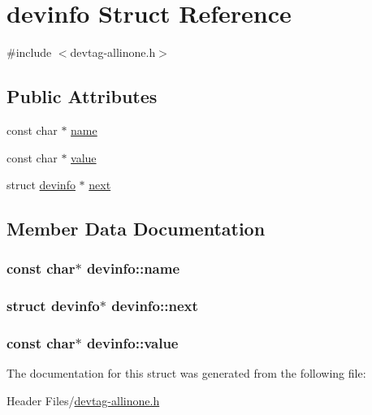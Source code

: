 \hypertarget{structdevinfo}{\section{devinfo \-Struct \-Reference}
\label{structdevinfo}
}


{\ttfamily \#include $<$devtag-\/allinone.\-h$>$}

\subsection*{\-Public \-Attributes}
\begin{DoxyCompactItemize}
\item 
const char $\ast$ \hyperlink{structdevinfo_a6a75887c01a3f6b18b552c1d42d54230}{name}
\item 
const char $\ast$ \hyperlink{structdevinfo_a93360abfa10790910e10eb424bbfb5ee}{value}
\item 
struct \hyperlink{structdevinfo}{devinfo} $\ast$ \hyperlink{structdevinfo_a7cde48c1967ffc2666c5facee5a51860}{next}
\end{DoxyCompactItemize}


\subsection{\-Member \-Data \-Documentation}
\hypertarget{structdevinfo_a6a75887c01a3f6b18b552c1d42d54230}{
\subsubsection[{name}]{\setlength{\rightskip}{0pt plus 5cm}const char$\ast$ {\bf devinfo\-::name}}}\label{structdevinfo_a6a75887c01a3f6b18b552c1d42d54230}
\hypertarget{structdevinfo_a7cde48c1967ffc2666c5facee5a51860}{
\subsubsection[{next}]{\setlength{\rightskip}{0pt plus 5cm}struct {\bf devinfo}$\ast$ {\bf devinfo\-::next}}}\label{structdevinfo_a7cde48c1967ffc2666c5facee5a51860}
\hypertarget{structdevinfo_a93360abfa10790910e10eb424bbfb5ee}{
\subsubsection[{value}]{\setlength{\rightskip}{0pt plus 5cm}const char$\ast$ {\bf devinfo\-::value}}}\label{structdevinfo_a93360abfa10790910e10eb424bbfb5ee}


\-The documentation for this struct was generated from the following file\-:\begin{DoxyCompactItemize}
\item 
\-Header Files/\hyperlink{devtag-allinone_8h}{devtag-\/allinone.\-h}\end{DoxyCompactItemize}
